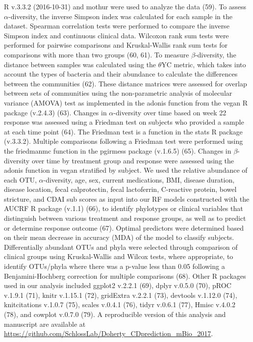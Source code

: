 \documentclass[12pt,]{article}
\begin{document}
R v.3.3.2 (2016-10-31) and mothur were used to analyze the data (59). To
assess \({\alpha}\)-diversity, the inverse Simpson index was calculated
for each sample in the dataset. Spearman correlation tests were
performed to compare the inverse Simpson index and continuous clinical
data. Wilcoxon rank sum tests were performed for pairwise comparisons
and Kruskal-Wallis rank sum tests for comparisons with more than two
groups (60, 61). To measure \({\beta}\)-diversity, the distance between
samples was calculated using the \({\theta}\)YC metric, which takes into
account the types of bacteria and their abundance to calculate the
differences between the communities (62). These distance matrices were
assessed for overlap between sets of communities using the
non-parametric analysis of molecular variance (AMOVA) test as
implemented in the adonis function from the vegan R package (v.2.4.3)
(63). Changes in \({\alpha}\)-diversity over time based on week 22
response was assessed using a Friedman test on subjects who provided a
sample at each time point (64). The Friedman test is a function in the
stats R package (v.3.3.2). Multiple comparisons following a Friedman
test were performed using the friedmanmc function in the pgirmess
package (v.1.6.5) (65). Changes in \({\beta}\)-diversity over time by
treatment group and response were assessed using the adonis function in
vegan stratified by subject. We used the relative abundance of each OTU,
\({\alpha}\)-diversity, age, sex, current medications, BMI, disease
duration, disease location, fecal calprotectin, fecal lactoferrin,
C-reactive protein, bowel stricture, and CDAI sub scores as input into
our RF models constructed with the AUCRF R package (v.1.1) (66), to
identify phylotypes or clinical variables that distinguish between
various treatment and response groups, as well as to predict or
determine response outcome (67). Optimal predictors were determined
based on their mean decrease in accuracy (MDA) of the model to classify
subjects. Differentially abundant OTUs and phyla were selected through
comparison of clinical groups using Kruskal-Wallis and Wilcox tests,
where appropriate, to identify OTUs/phyla where there was a p-value less
than 0.05 following a Benjamini-Hochberg correction for multiple
comparisons (68). Other R packages used in our analysis included ggplot2
v.2.2.1 (69), dplyr v.0.5.0 (70), pROC v.1.9.1 (71), knitr v.1.15.1
(72), gridExtra v.2.2.1 (73), devtools v.1.12.0 (74), knitcitations
v.1.0.7 (75), scales v.0.4.1 (76), tidyr v.0.6.1 (77), Hmisc v.4.0.2
(78), and cowplot v.0.7.0 (79). A reproducible version of this analysis
and manuscript are available at
\url{https://github.com/SchlossLab/Doherty_CDprediction_mBio_2017}.
\end{document}
